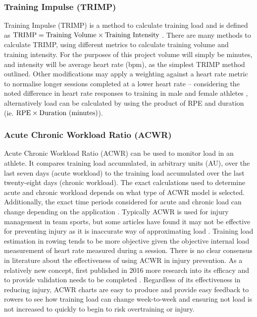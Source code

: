 \subsubsection{Training Impulse (TRIMP)}
Training Impulse (TRIMP) is a method to calculate training load and is defined as  $\textnormal{TRIMP} = \textnormal{Training Volume} \times \textnormal{Training Intensity}$ \autocite{TRIMPmethod}. There are many methods to calculate TRIMP, using different metrics to calculate training volume and training intensity. For the purposes of this project volume will simply be minutes, and intensity will be average heart rate (bpm), as the simplest TRIMP method outlined. Other modifications may apply a weighting against a heart rate metric to normalise longer sessions completed at a lower heart rate -- considering the noted difference in heart rate responses to training in male and female athletes \autocite{Morton1990}, alternatively load can be calculated by using the product of RPE and duration (ie. $\textnormal{RPE} \times \textnormal{Duration (minutes)}$).

\subsubsection{Acute Chronic Workload Ratio (ACWR)}
Acute Chronic Workload Ratio (ACWR) can be used to monitor load in an athlete. It compares training load accumulated, in arbitrary units (AU), over the last seven days (acute workload) to the training load accumulated over the last twenty-eight days (chronic workload). The exact calculations used to determine acute and chronic workload depends on what type of ACWR model is selected. Additionally, the exact time periods considered for acute and chronic load can change depending on the application \cite{White2023}. Typically ACWR is used for injury management in team sports, but some articles have found it may not be effective for preventing injury as it is inaccurate way of approximating load \cite{Impellizzeri2020}. Training load estimation in rowing tends to be more objective given the objective internal load measurement of heart rate measured during a session. There is no clear consensus in literature about the effectiveness of using ACWR in injury prevention. As a relatively new concept, first published in 2016 more research into its efficacy and to provide validation needs to be completed \cite{Zouhal2021}. Regardless of its effectiveness in reducing injury, ACWR charts are easy to produce and provide easy feedback to rowers to see how training load can change week-to-week and ensuring not load is not increased to quickly to begin to risk overtraining or injury.

